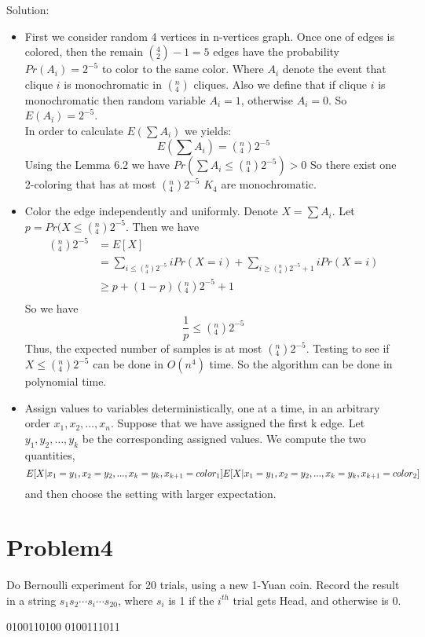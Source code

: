 \documentclass[12pt]{article}
\begin{document}
Solution:\\
\begin{itemize}
\item
First we consider random 4 vertices in n-vertices graph. Once one of edges is colored, then the remain $({}_2^4)-1 = 5$ edges have the probability $Pr(A_i) = 2^{-5}$ to color to the same color. Where $A_i$ denote the event that clique $i$ is monochromatic in $({}_4^n)$ cliques. Also we define that if clique $i$ is monochromatic then random variable $A_i=1$, otherwise $A_i=0$. So $E(A_i) = 2^{-5}$.\\
In order to calculate $E(\sum A_i)$ we yields:
\begin{equation}
    E(\sum A_i) = ({}_4^n)2^{-5}
\end{equation}
Using the Lemma 6.2 we have $Pr(\sum A_i \le ({}_4^n)2^{-5})>0 $
So there exist one 2-coloring that has at most $({}_4^n)2^{-5}$ $K_4$ are monochromatic.

\item
Color the edge independently and uniformly. Denote $X = \sum A_i$. Let $p = Pr(X \le ({}_4^n)2^{-5}$. Then we have
\begin{equation}
    \begin{split}
    ({}_4^n)2^{-5} &= E[X] \\
    &= \sum_{i \le ({}_4^n)2^{-5}} i Pr(X=i) + \sum_{i \ge ({}_4^n)2^{-5}+1} i Pr(X=i) \\
    &\ge p + (1-p) ({}_4^n)2^{-5}+1 \\
    \end{split}
\end{equation}
So we have
\begin{equation}
    \frac{1}{p} \le ({}_4^n)2^{-5}
\end{equation}
Thus, the expected number of samples is at most $({}_4^n)2^{-5}$. Testing to see if $X \le ({}_4^n)2^{-5}$ can be done in $O(n^4)$ time. So the algorithm can be done in polynomial time.
\item
Assign values to variables deterministically, one at a time, in an arbitrary order
$x_1, x_2, \dots , x_n$. Suppose that we have assigned the first k edge. Let $y_1, y_2, \dots , y_k$
be the corresponding assigned values. We compute the two quantities,
\begin{equation}
    E[X | x_1 = y_1, x_2 = y_2, . . . , x_k = y_k, x_{k+1} = color_1 ]\\
    E[X | x_1 = y_1, x_2 = y_2, . . . , x_k = y_k, x_{k+1} = color_2 ]\\
\end{equation}
and then choose the setting with larger expectation.
\end{itemize}
\section{Problem4}
Do Bernoulli experiment for 20 trials, using a new 1-Yuan coin. Record the result in a
string $s_1s_2 \cdots s_i \cdots s_{20}$, where $s_i$ is 1 if the $i^{th}$ trial gets Head, and otherwise is 0.

0100110100 0100111011
\end{document}
